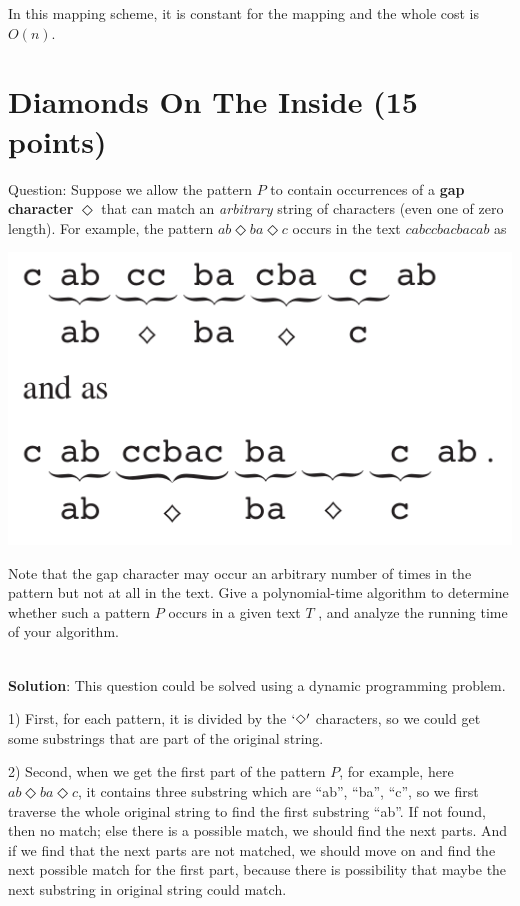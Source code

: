 \documentclass{article}
\begin{document}
In this mapping scheme, it is constant for the mapping and the whole cost is $O(n)$.

\section{Diamonds On The Inside (15 points)}
Question: Suppose we allow the pattern $P$ to contain occurrences of a \textbf{gap character} $\Diamond$ that can match an \emph{arbitrary} string of characters (even one of zero length). For example, the pattern $ab\Diamond{ba}\Diamond{c}$ occurs in the text $cabccbacbacab$ as

\begin{center} %
\includegraphics[scale=0.3]{hw7_p1.png} %
\end{center}

\noindent Note that the gap character may occur an arbitrary number of times in the pattern but not at all in the text. Give a polynomial-time algorithm to determine whether such a pattern $P$ occurs in a given text $T$ , and analyze the running time of your algorithm.

~\\
\textbf{Solution}:\newline
\indent This question could be solved using a dynamic programming problem.

1) First, for each pattern, it is divided by the $`\Diamond'{}$ characters, so we could get some substrings that are part of the original string.

2) Second, when we get the first part of the pattern $P$, for example, here $ab\Diamond{}ba\Diamond{}c$, it contains three substring which are ``ab'', ``ba'', ``c'', so we first traverse the whole original string to find the first substring ``ab''. If not found, then no match; else there is a possible match, we should find the next parts. And if we find that the next parts are not matched, we should move on and find the next possible match for the first part, because there is possibility that maybe the next substring in original string could match.
\end{document}
